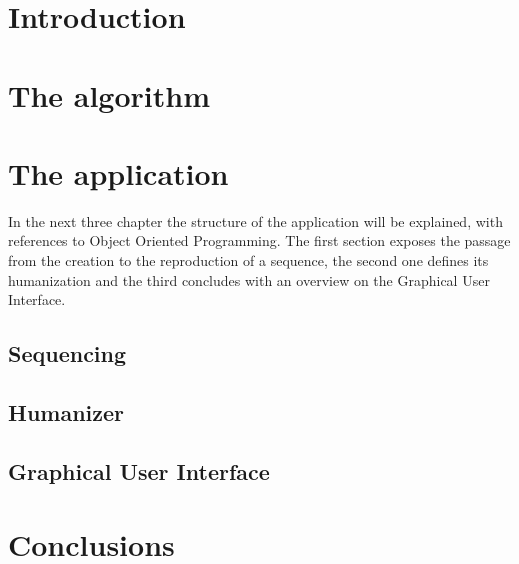 \documentclass[a4paper, 12pt]{article}
\begin{document}
\section{Introduction}
\label{sec:intro}

\section{The algorithm}
\label{sec:algorithm}

\section{The application}
\label{sec:app}
In the next three chapter the structure of the application will be explained, with references to Object Oriented Programming. The first section exposes the passage from the creation to the reproduction of a sequence, the second one defines its humanization and the third concludes with an overview on the Graphical User Interface.
\subsection{Sequencing}

\subsection{Humanizer}

\subsection{Graphical User Interface}

\section{Conclusions}
\label{sec:concl}


\end{document}
